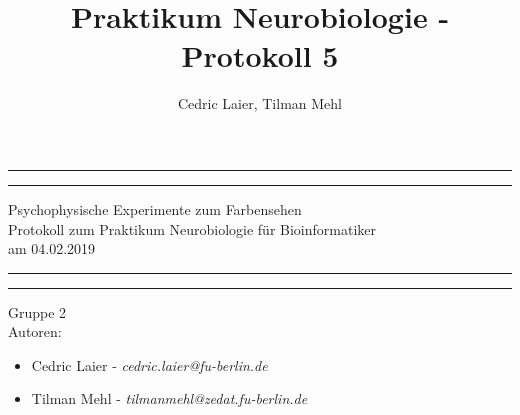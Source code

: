 \documentclass[a4paper]{article}
\title{Praktikum Neurobiologie - Protokoll 5}
\author{Cedric Laier, Tilman Mehl}
\begin{document}
\begin{titlepage} %

	\centering %
	
	\scshape %
	
	\vspace*{\baselineskip} %
	
	
	\rule{\textwidth}{1.6pt}\vspace*{-\baselineskip}\vspace*{2pt} %
	\rule{\textwidth}{0.4pt} %
	\vspace{0.75\baselineskip} %
	{\LARGE Psychophysische Experimente zum Farbensehen} {\\Protokoll zum Praktikum Neurobiologie für Bioinformatiker\\ am 04.02.2019} %

	
	\vspace{0.75\baselineskip} %
	
	\rule{\textwidth}{0.4pt}\vspace*{-\baselineskip}\vspace{3.2pt} %
	\rule{\textwidth}{1.6pt} %
	
	\vspace{2\baselineskip} %
	
	\vspace{2.0\baselineskip} %

{\LARGE Gruppe 2}
\vspace{2.5\baselineskip} \\
	
{\LARGE Autoren:}
\begin{itemize}
\item Cedric Laier - \textit{cedric.laier@fu-berlin.de}
\item Tilman Mehl - \textit{tilmanmehl@zedat.fu-berlin.de}
\end{itemize}
\vspace{2.5\baselineskip}


\end{titlepage}
\end{document}
